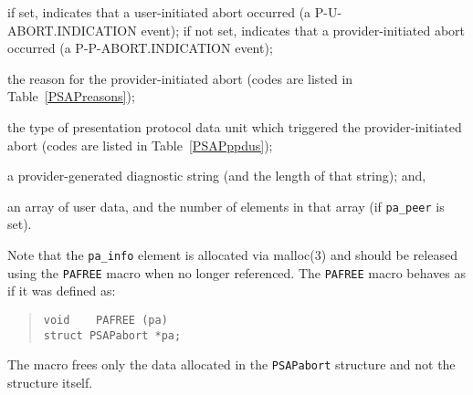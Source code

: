 \begin{describe}
\item[\verb"pa\_peer":] if set, indicates that a user-initiated abort occurred
(a {\sf P-U-ABORT.INDICATION\/} event);
if not set, indicates that a provider-initiated abort occurred
(a {\sf P-P-ABORT.INDICATION\/} event);

\item[\verb"pa\_reason":] the reason for the provider-initiated
abort (codes are listed in Table~\ref{PSAPreasons});

\item[\verb"pa\_ppdu":] the type of presentation protocol data unit which
triggered the provider-initiated abort
(codes are listed in Table~\ref{PSAPppdus});

\item[\verb"pa\_data"/\verb"pa\_cc":] a provider-generated diagnostic string
(and the length of that string);
and,

\item[\verb"pa\_info"/\verb"pa\_ninfo":] an array of user data,
and the number of elements in that array (if \verb"pa_peer" is set).
\end{describe}
Note that the \verb"pa_info" element is allocated via \man malloc(3) and
should be released using the \verb"PAFREE" macro  when no longer referenced.
The \verb"PAFREE" macro behaves as if it was defined as:
\begin{quote}\small\begin{verbatim}
void    PAFREE (pa)
struct PSAPabort *pa;
\end{verbatim}\end{quote}
The macro frees only the data allocated in the \verb"PSAPabort" structure
and not the structure itself.


